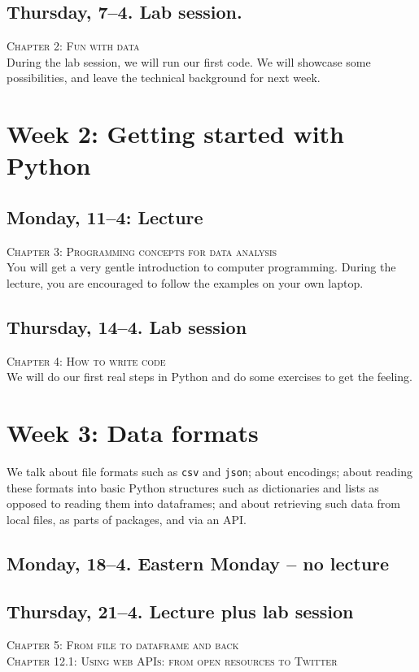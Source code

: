 \subsection*{Thursday, 7--4. Lab session.}
\textsc{ Chapter 2: Fun with data}\\

During the lab session, we will run our first code. We will showcase some possibilities, and leave the technical background for next week.


\section*{Week 2: Getting started with Python  }

\subsection*{Monday, 11--4: Lecture}
\textsc{ Chapter 3: Programming concepts for data analysis}\\
You will get a very gentle introduction to computer programming. During the lecture, you are encouraged to follow the examples on your own laptop.

\subsection*{Thursday, 14--4. Lab session}
\textsc{ Chapter 4: How to write code}\\
We will do our first real steps in Python and do some exercises to get the feeling.\\ 


\section*{Week 3:  Data formats}

We talk about file formats such as \texttt{csv} and \texttt{json}; about encodings; about reading these formats into basic Python structures such as dictionaries and lists as opposed to reading them into dataframes; and about retrieving such data from local files, as parts of packages, and via an API.

\subsection*{Monday, 18--4. Eastern Monday -- no lecture}

\subsection*{Thursday, 21--4. Lecture plus lab session}
\textsc{ Chapter 5: From file to dataframe and back}\\
\textsc{ Chapter 12.1: Using web APIs: from open resources to Twitter}\\

